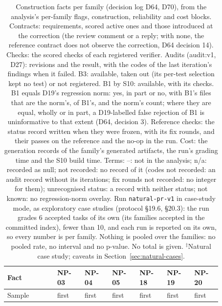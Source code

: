 \begin{table}[t]\centering\scriptsize\setlength{\tabcolsep}{4pt}
\caption{Construction facts per family (decision log D64, D70), from the analysis's per-family flags, construction, reliability and cost blocks. Contracts: requirements, scored active ones and those introduced at the correction (the review comment or a reply; with none, the reference contract does not observe the correction, D64 decision 14). Checks: the scored checks of each registered verifier. Audits (audit:v1, D27): revisions and the result, with the codes of the last iteration's findings when it failed. B3: available, taken out (its per-test selection kept no test) or not registered. B1 by S10: available, with its checks. B1 equals D19's regression norm: yes, in part or no, with B1's files that are the norm's, of B1's, and the norm's count; where they are equal, wholly or in part, a D19-labelled false rejection of B1 is uninformative to that extent (D64, decision 3). Reference checks: the status record written when they were frozen, with its fix rounds, and their passes on the reference and the no-op in the run. Cost: the generation records of the family's generated artifacts, the run's grading time and the S10 build time. Terms: --: not in the analysis; n/a: recorded as null; not recorded: no record of it (codes not recorded: an audit record without its iterations; fix rounds not recorded: no integer for them); unrecognised status: a record with neither status; not known: no regression-norm overlay. Run \texttt{natural-pr-v1} in case-study mode, as exploratory case studies (protocol \S19.6, \S20.3): the run grades 6 accepted tasks of its own (its families accepted in the committed index), fewer than 10, and each run is reported on its own, so every number is per family. Nothing is pooled over the families: no pooled rate, no interval and no p-value. No total is given. $^{\ddagger}$Natural case study; caveats in Section~\ref{sec:natural-cases}.}\label{tab:nr-construction}
\begin{tabular}{p{0.2\linewidth}p{0.112\linewidth}p{0.112\linewidth}p{0.112\linewidth}p{0.112\linewidth}p{0.112\linewidth}p{0.112\linewidth}}\toprule Fact & NP-03 & NP-04 & NP-05 & NP-18 & NP-19 & NP-20 \\\midrule
\raggedright\hspace{0pt}Sample & \raggedright\hspace{0pt}first & \raggedright\hspace{0pt}first & \raggedright\hspace{0pt}first & \raggedright\hspace{0pt}first & \raggedright\hspace{0pt}first & \raggedright\hspace{0pt}first \tabularnewline

\end{tabular}
\end{table}
